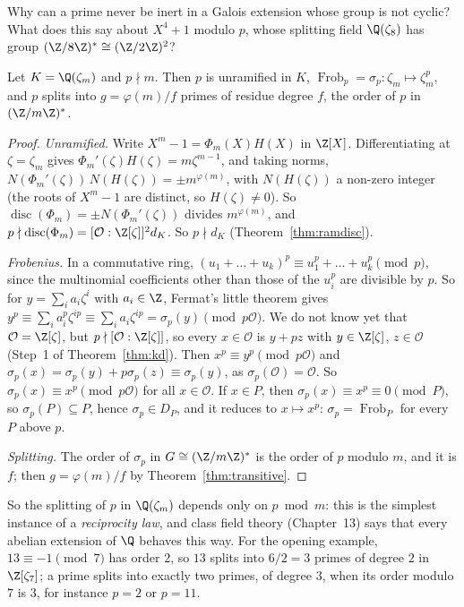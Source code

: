 \begin{think}
Why can a prime never be inert in a Galois extension whose group is not cyclic? What does this say about $X^4+1$
modulo $p$, whose splitting field $\Q(\zeta_8)$ has group $(\Z/8\Z)^*\cong(\Z/2\Z)^2$?
\end{think}

\begin{theorem}\label{thm:cyclosplit}
Let $K=\Q(\zeta_m)$ and $p\nmid m$. Then $p$ is unramified in $K$, $\operatorname{Frob}_p=\sigma_p:\zeta_m\mapsto
\zeta_m^p$, and $p$ splits into $g=\varphi(m)/f$ primes of residue degree $f$, the order of $p$ in $(\Z/m\Z)^*$.
\end{theorem}
\begin{proof}
\emph{Unramified.} Write $X^m-1=\Phi_m(X)H(X)$ in $\Z[X]$. Differentiating at $\zeta=\zeta_m$ gives
$\Phi_m'(\zeta)H(\zeta)=m\zeta^{m-1}$, and taking norms, $N(\Phi_m'(\zeta))\,N(H(\zeta))=\pm m^{\varphi(m)}$, with
$N(H(\zeta))$ a non-zero integer (the roots of $X^m-1$ are distinct, so $H(\zeta)\ne0$). So
$\operatorname{disc}(\Phi_m)=\pm N(\Phi_m'(\zeta))$ divides $m^{\varphi(m)}$, and $p\nmid\operatorname{disc}(\Phi_m)=
[\mathcal O:\Z[\zeta]]^2d_K$. So $p\nmid d_K$ (Theorem~\ref{thm:ramdisc}).

\emph{Frobenius.} In a commutative ring, $(u_1+\dots+u_k)^p\equiv u_1^p+\dots+u_k^p\pmod p$, since the multinomial
coefficients other than those of the $u_i^p$ are divisible by $p$. So for $y=\sum_ia_i\zeta^i$ with $a_i\in\Z$, Fermat's
little theorem gives $y^p\equiv\sum_ia_i^p\zeta^{ip}\equiv\sum_ia_i\zeta^{ip}=\sigma_p(y)\pmod{p\mathcal O}$. We do not
know yet that $\mathcal O=\Z[\zeta]$, but $p\nmid[\mathcal O:\Z[\zeta]]$, so every $x\in\mathcal O$ is $y+pz$ with
$y\in\Z[\zeta]$, $z\in\mathcal O$ (Step~1 of Theorem~\ref{thm:kd}). Then $x^p\equiv y^p\pmod{p\mathcal O}$ and
$\sigma_p(x)=\sigma_p(y)+p\sigma_p(z)\equiv\sigma_p(y)$, as $\sigma_p(\mathcal O)=\mathcal O$. So $\sigma_p(x)\equiv x^p
\pmod{p\mathcal O}$ for all $x\in\mathcal O$. If $x\in P$,
then $\sigma_p(x)\equiv x^p\equiv0\pmod P$, so $\sigma_p(P)\subseteq P$, hence $\sigma_p\in D_P$, and it reduces to
$x\mapsto x^p$: $\sigma_p=\operatorname{Frob}_P$ for every $P$ above $p$.

\emph{Splitting.} The order of $\sigma_p$ in $G\cong(\Z/m\Z)^*$ is the order of $p$ modulo $m$, and it is $f$; then
$g=\varphi(m)/f$ by Theorem~\ref{thm:transitive}.
\end{proof}

So the splitting of $p$ in $\Q(\zeta_m)$ depends only on $p\bmod m$: this is the simplest instance of a \emph{reciprocity
law}, and class field theory (Chapter~13) says that every abelian extension of $\Q$ behaves this way. For the opening
example, $13\equiv-1\pmod 7$ has order $2$, so $13$ splits into $6/2=3$ primes of degree $2$ in $\Z[\zeta_7]$; a prime
splits into exactly two primes, of degree $3$, when its order modulo $7$ is $3$, for instance $p=2$ or $p=11$.

